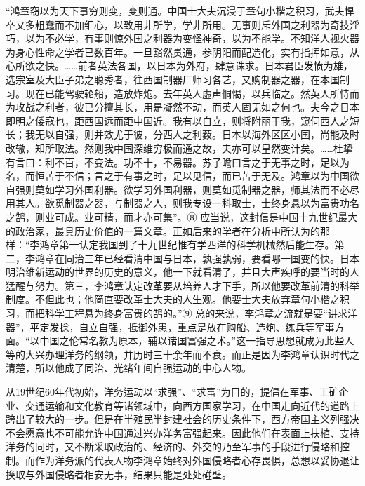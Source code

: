 \documentclass[10pt,a4paper]{beamer} %
\begin{document}
	\begin{frame}
		“鸿章窃以为天下事穷则变，变则通。中国士大夫沉浸于章句小楷之积习，武夫悍卒又多粗蠢而不加细心，以致用非所学，学非所用。无事则斥外国之利器为奇技淫巧，以为不必学，有事则惊外国之利器为变怪神奇，以为不能学。不知洋人视火器为身心性命之学者已数百年。一旦豁然贯通，参阴阳而配造化，实有指挥如意，从心所欲之快。……前者英法各国，以日本为外府，肆意诛求。日本君臣发愤为雄，选宗室及大臣子弟之聪秀者，往西国制器厂师习各艺，又购制器之器，在本国制习。现在已能驾驶轮船，造放炸炮。去年英人虚声恫愒，以兵临之。然英人所恃而为攻战之利者，彼已分擅其长，用是凝然不动，而英人固无如之何也。夫今之日本即明之倭寇也，距西国远而距中国近。我有以自立，则将附丽于我，窥伺西人之短长；我无以自强，则并效尤于彼，分西人之利薮。日本以海外区区小国，尚能及时改辙，知所取法。然则我中国深维穷极而通之故，夫亦可以皇然变计矣。……杜挚有言曰：利不百，不变法。功不十，不易器。苏子瞻曰言之于无事之时，足以为名，而恒苦于不信；言之于有事之时，足以见信，而已苦于无及。鸿章以为中国欲自强则莫如学习外国利器。欲学习外国利器，则莫如觅制器之器，师其法而不必尽用其人。欲觅制器之器，与制器之人，则我专设一科取士，士终身悬以为富贵功名之鹄，则业可成。业可精，而才亦可集”。⑧ 应当说，这封信是中国十九世纪最大的政治家，最具历史价值的一篇文章。正如后来的学者在分析中所认为的那样：“李鸿章第一认定我国到了十九世纪惟有学西洋的科学机械然后能生存。第二，李鸿章在同治三年已经看清中国与日本，孰强孰弱，要看哪一国变的快。日本明治维新运动的世界的历史的意义，他一下就看清了，并且大声疾呼的要当时的人猛醒与努力。第三，李鸿章认定改革要从培养人才下手，所以他要改革前清的科举制度。不但此也；他简直要改革士大夫的人生观。他要士大夫放弃章句小楷之积习，而把科学工程悬为终身富贵的鹄的。”⑨ 总的来说，李鸿章之流就是要“讲求洋器”，平定发捻，自立自强，抵御外患，重点是放在购船、造炮、练兵等军事方面。“以中国之伦常名教为原本，辅以诸国富强之术。”这一指导思想就成为此些人等的大兴办理洋务的纲领，并历时三十余年而不衰。而正是因为李鸿章认识时代之清楚，所以他成了同治、光绪年间自强运动的中心人物。
	\end{frame}
	\begin{frame}
		从19世纪60年代初始，洋务运动以“求强”、“求富”为目的，提倡在军事、工矿企业、交通运输和文化教育等诸领域中，向西方国家学习，在中国走向近代的道路上跨出了较大的一步。但是在半殖民半封建社会的历史条件下，西方帝国主义列强决不会愿意也不可能允许中国通过兴办洋务富强起来。因此他们在表面上扶植、支持洋务的同时，又不断采取政治的、经济的、外交的乃至军事的手段进行侵略和控制。而作为洋务派的代表人物李鸿章始终对外国侵略者心存畏惧，总想以妥协退让换取与外国侵略者相安无事，结果只能是处处碰壁。
	\end{frame}
	
\end{document}
